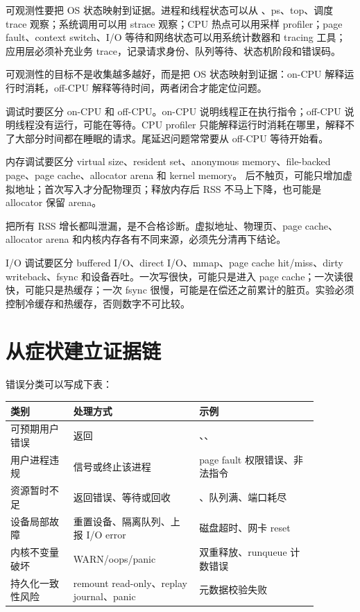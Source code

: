 可观测性要把 OS 状态映射到证据。进程和线程状态可以从 、ps、top、调度 trace 观察；系统调用可以用 strace 观察；CPU 热点可以用采样 profiler；page fault、context switch、I/O 等待和网络状态可以用系统计数器和 tracing 工具；应用层必须补充业务 trace，记录请求身份、队列等待、状态机阶段和错误码。

\begin{keyidea}
可观测性的目标不是收集越多越好，而是把 OS 状态映射到证据：on-CPU 解释运行时消耗，off-CPU 解释等待时间，两者闭合才能定位问题。
\end{keyidea}

调试时要区分 on-CPU 和 off-CPU。on-CPU 说明线程正在执行指令；off-CPU 说明线程没有运行，可能在等待。CPU profiler 只能解释运行时消耗在哪里，解释不了大部分时间都在睡眠的请求。尾延迟问题常常要从 off-CPU 等待开始看。

内存调试要区分 virtual size、resident set、anonymous memory、file-backed page、page cache、allocator arena 和 kernel memory。 后不触页，可能只增加虚拟地址；首次写入才分配物理页；释放内存后 RSS 不马上下降，也可能是 allocator 保留 arena。

\begin{warningbox}
把所有 RSS 增长都叫泄漏，是不合格诊断。虚拟地址、物理页、page cache、allocator arena 和内核内存各有不同来源，必须先分清再下结论。
\end{warningbox}

I/O 调试要区分 buffered I/O、direct I/O、mmap、page cache hit/miss、dirty writeback、fsync 和设备吞吐。一次写很快，可能只是进入 page cache；一次读很快，可能只是热缓存；一次 fsync 很慢，可能是在偿还之前累计的脏页。实验必须控制冷缓存和热缓存，否则数字不可比较。

\section{从症状建立证据链}

错误分类可以写成下表：

\begin{longtable}{|L{0.18\linewidth}|L{0.36\linewidth}|L{0.34\linewidth}|}
\toprule
类别 & 处理方式 & 示例 \\
\midrule
可预期用户错误 & 返回  & 、、 \\\tablerowrule
用户进程违规 & 信号或终止该进程 & page fault 权限错误、非法指令 \\\tablerowrule
资源暂时不足 & 返回错误、等待或回收 & 、队列满、端口耗尽 \\\tablerowrule
设备局部故障 & 重置设备、隔离队列、上报 I/O error & 磁盘超时、网卡 reset \\\tablerowrule
内核不变量破坏 & WARN/oops/panic & 双重释放、runqueue 计数错误 \\\tablerowrule
持久化一致性风险 & remount read-only、replay journal、panic & 元数据校验失败 \\
\bottomrule
\end{longtable}

